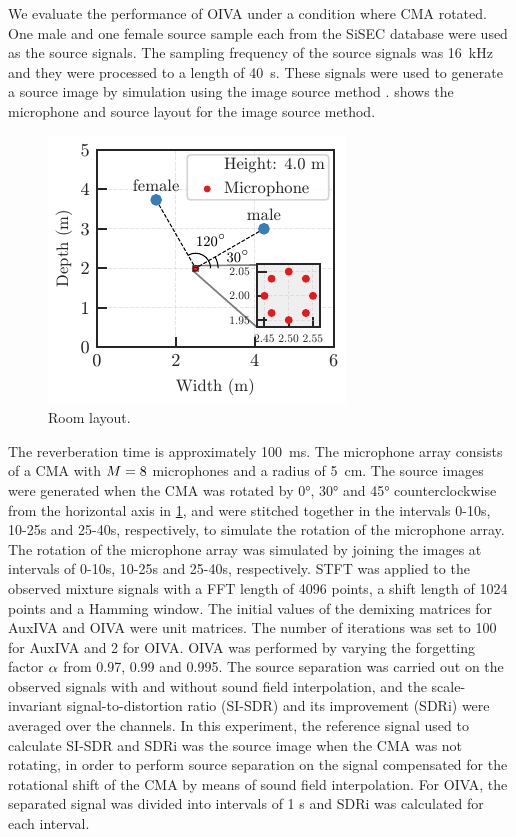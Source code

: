 \documentclass{article}
\begin{document}
We evaluate the performance of OIVA under a condition where CMA rotated.
One male and one female source sample each from the SiSEC database \cite{Araki:2012:LVAICA} were used as the source signals.
The sampling frequency of the source signals was \SI{16}{\kilo\hertz} and they were processed to a length of \SI{40}{\second}.
These signals were used to generate a source image by simulation using the image source method \cite{Allen:1979:JASA}.
 shows the microphone and source layout for the image source method.
\begin{figure}[t]
  \centering
  \includegraphics{figures/room_layout.pdf}
  \caption{Room layout.}
  \label{fig:room}
\end{figure}
The reverberation time is approximately \SI{100}{\milli\second}.
The microphone array consists of a CMA with $M = 8$ microphones and a radius of \SI{5}{\centi\metre}.
The source images were generated when the CMA was rotated by 0°, 30° and 45° counterclockwise from the horizontal axis in \cref{fig:room},
and were stitched together in the intervals 0-10s, 10-25s and 25-40s, respectively, to simulate the rotation of the microphone array.
The rotation of the microphone array was simulated by joining the images at intervals of 0-10s, 10-25s and 25-40s, respectively.
%
STFT was applied to the observed mixture signals with a FFT length of 4096 points, a shift length of 1024 points and a Hamming window.
The initial values of the demixing matrices for AuxIVA and OIVA were unit matrices.
The number of iterations was set to 100 for AuxIVA and 2 for OIVA.
OIVA was performed by varying the forgetting factor $\alpha$ from \num{0.97}, \num{0.99} and \num{0.995}.
The source separation was carried out on the observed signals with and without sound field interpolation,
and the scale-invariant signal-to-distortion ratio (SI-SDR) \cite{LeRoux:2019:ICASSP} and its improvement (SDRi) were averaged over the channels.
In this experiment, the reference signal used to calculate SI-SDR and SDRi was the source image when the CMA was not rotating, in order to perform source separation on the signal compensated for the rotational shift of the CMA by means of sound field interpolation.
For OIVA, the separated signal was divided into intervals of 1 s and SDRi was calculated for each interval.
\end{document}
